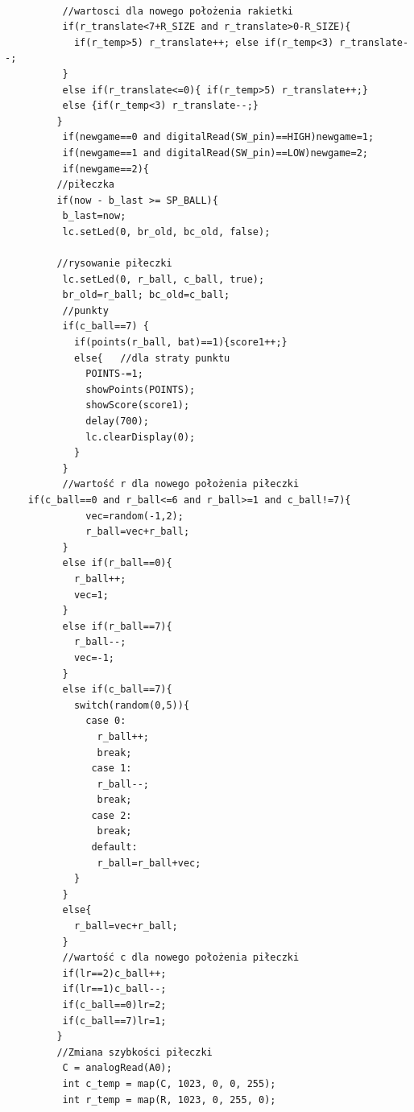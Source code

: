 \documentclass[12pt,notitlepage]{article}
\begin{document}
\begin{lstlisting}[style=CStyle]
           
          //wartosci dla nowego położenia rakietki
          if(r_translate<7+R_SIZE and r_translate>0-R_SIZE){
            if(r_temp>5) r_translate++; else if(r_temp<3) r_translate--;
          }
          else if(r_translate<=0){ if(r_temp>5) r_translate++;}
          else {if(r_temp<3) r_translate--;}
         }
          if(newgame==0 and digitalRead(SW_pin)==HIGH)newgame=1;
          if(newgame==1 and digitalRead(SW_pin)==LOW)newgame=2;
          if(newgame==2){
         //piłeczka
         if(now - b_last >= SP_BALL){
          b_last=now;
          lc.setLed(0, br_old, bc_old, false);
          
         //rysowanie piłeczki
          lc.setLed(0, r_ball, c_ball, true);          
          br_old=r_ball; bc_old=c_ball;
          //punkty
          if(c_ball==7) {
            if(points(r_ball, bat)==1){score1++;}
            else{	//dla straty punktu 
              POINTS-=1;
              showPoints(POINTS);
              showScore(score1);
              delay(700);
              lc.clearDisplay(0);
            }
          }          
          //wartość r dla nowego położenia piłeczki
	if(c_ball==0 and r_ball<=6 and r_ball>=1 and c_ball!=7){		  
              vec=random(-1,2);
              r_ball=vec+r_ball;
          }
          else if(r_ball==0){
            r_ball++;
            vec=1;
          }
          else if(r_ball==7){
            r_ball--;
            vec=-1;
          }
          else if(c_ball==7){
            switch(random(0,5)){
              case 0:
                r_ball++;
                break;
               case 1:
                r_ball--;
                break;
               case 2:
                break;
               default:
                r_ball=r_ball+vec; 
            }
          }
          else{
            r_ball=vec+r_ball;
          }
          //wartość c dla nowego położenia piłeczki
          if(lr==2)c_ball++;
          if(lr==1)c_ball--;
          if(c_ball==0)lr=2;
          if(c_ball==7)lr=1;
         }
         //Zmiana szybkości piłeczki
          C = analogRead(A0);
          int c_temp = map(C, 1023, 0, 0, 255);
          int r_temp = map(R, 1023, 0, 255, 0);
          

\end{lstlisting}
\end{document}
